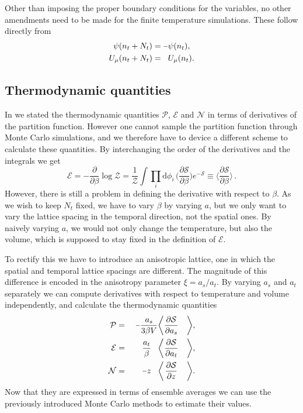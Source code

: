Other than imposing the proper boundary conditions for the variables, no other
amendments need to be made for the finite temperature simulations. These follow
directly from 
%
\begin{align}
  \psi(n_t + N_t) &= \minus \psi(n_t), \\
  U_{\mu}(n_t + N_t) &= \hphantom{\minus} U_{\mu}(n_t).
\end{align}

\subsection{Thermodynamic quantities}

In  we stated the thermodynamic quantities $\mathcal{P}$,
$\mathcal{E}$ and $\mathcal{N}$ in terms of derivatives of the partition
function. However one cannot sample the partition function through Monte Carlo
simulations, and we therefore have to device a different scheme to calculate
these quantities. By interchanging the order of the derivatives and the
integrals we get 
%
\begin{equation}
  \mathcal{E} = \minus\frac{\partial}{\partial \beta} \log \mathcal{Z}
    = \frac{1}{\mathcal{Z}} \int \prod_i \mathrm{d} \phi_i \, 
    \bigg( \frac{\partial\mathcal{S}}{\partial \beta} \bigg) e^{-\mathcal{S}}
    \equiv \bigg\langle \frac{\partial\mathcal{S}}{\partial \beta} \bigg\rangle
    \,.
\end{equation}
%
However, there is still a problem in defining the derivative with respect to
$\beta$. As we wish to keep $N_t$ fixed, we have to vary $\beta$ by varying $a$,
but we only want to vary the lattice spacing in the temporal direction, not the
spatial ones. By naively varying $a$, we would not only change the temperature,
but also the volume, which is supposed to stay fixed in the definition of
$\mathcal{E}$.

To rectify this we have to introduce an anisotropic lattice, one in which the
spatial and temporal lattice spacings are different. The magnitude of this
difference is encoded in the anisotropy parameter $\xi = a_s / a_t$. By varying
$a_s$ and $a_t$ separately we can compute derivatives with respect to
temperature and volume independently, and calculate the thermodynamic quantities
%
\begin{alignat}{99}
  \mathcal{P} &{}={}& \centermathcell{\minus\frac{a_s}{3 \beta V}} \bigg\langle &
    \centermathcell{\frac{\partial \mathcal{S}}{\partial a_s}} &\bigg\rangle, \\
  \mathcal{E} &{}={}& \centermathcell{\frac{a_t}{\beta}} \bigg\langle &
    \centermathcell{\frac{\partial \mathcal{S}}{\partial a_t}} &\bigg\rangle, \\
  \mathcal{N} &{}={}& \centermathcell{\minus{}z} \bigg\langle & 
    \centermathcell{\frac{\partial \mathcal{S}}{\partial z}} &\bigg\rangle.
\end{alignat}
%
Now that they are expressed in terms of ensemble averages we can use the
previously introduced Monte Carlo methods to estimate their values.

